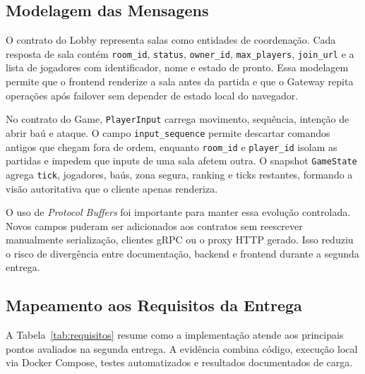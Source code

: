 \documentclass[portuguese]{sbcreviews-2025}%
\begin{document}
\subsection{Modelagem das Mensagens}

O contrato do Lobby representa salas como entidades de coordenação. Cada resposta de sala contém \texttt{room\_id}, \texttt{status}, \texttt{owner\_id}, \texttt{max\_players}, \texttt{join\_url} e a lista de jogadores com identificador, nome e estado de pronto. Essa modelagem permite que o frontend renderize a sala antes da partida e que o Gateway repita operações após failover sem depender de estado local do navegador.

No contrato do Game, \texttt{PlayerInput} carrega movimento, sequência, intenção de abrir baú e ataque. O campo \texttt{input\_sequence} permite descartar comandos antigos que chegam fora de ordem, enquanto \texttt{room\_id} e \texttt{player\_id} isolam as partidas e impedem que inputs de uma sala afetem outra. O snapshot \texttt{GameState} agrega \texttt{tick}, jogadores, baús, zona segura, ranking e ticks restantes, formando a visão autoritativa que o cliente apenas renderiza.

O uso de \textit{Protocol Buffers} foi importante para manter essa evolução controlada. Novos campos puderam ser adicionados aos contratos sem reescrever manualmente serialização, clientes gRPC ou o proxy HTTP gerado. Isso reduziu o risco de divergência entre documentação, backend e frontend durante a segunda entrega.

\subsection{Mapeamento aos Requisitos da Entrega}

A Tabela~\ref{tab:requisitos} resume como a implementação atende aos principais pontos avaliados na segunda entrega. A evidência combina código, execução local via Docker Compose, testes automatizados e resultados documentados de carga.
\end{document}
